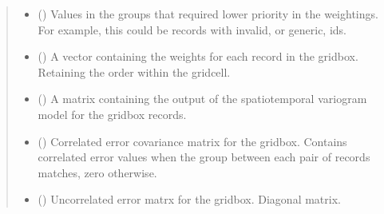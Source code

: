 \documentclass[letterpaper,10pt,english]{sphinxmanual}
\begin{document}
\begin{fulllineitems}
\begin{quote}
\begin{description}
\begin{itemize}
\item {}
\sphinxAtStartPar
{} () \textendash{} Values in the groups that required lower priority in the weightings.
For example, this could be records with invalid, or generic, ids.

\end{itemize}

\sphinxAtStartPar
{}

\sphinxAtStartPar
\begin{itemize}
\item {}
\sphinxAtStartPar
{} () \textendash{} A vector containing the weights for each record in the grid\sphinxhyphen{}box.
Retaining the order within the grid\sphinxhyphen{}cell.

\item {}
\sphinxAtStartPar
{} () \textendash{} A matrix containing the output of the spatio\sphinxhyphen{}temporal variogram model
for the grid\sphinxhyphen{}box records.

\item {}
\sphinxAtStartPar
{} () \textendash{} Correlated error covariance matrix for the grid\sphinxhyphen{}box. Contains correlated
error values when the group between each pair of records matches, zero
otherwise.

\item {}
\sphinxAtStartPar
{} () \textendash{} Uncorrelated error matrx for the grid\sphinxhyphen{}box. Diagonal matrix.

\end{itemize}


\end{description}\end{quote}

\end{fulllineitems}
\end{document}

